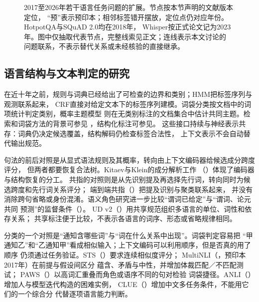 \begin{figure}[htbp]
  \centering
  
  \caption{2017至2026年若干语言任务问题的扩展。节点按本节声明的文献版本定位，
  “预”表示预印本；相邻标签错开摆放，定位点仍对应年份。HotpotQA与SQuAD 2.0均在2018年，
  Whisper按正式论文记为2023年。图中仅抽取代表节点，完整线索见正文；连线表示本文讨论的
  问题联系，不表示替代关系或未经核验的直接继承。}
  \label{fig:nlp-task-history}
\end{figure}

\FloatBarrier
\subsection{语言结构与文本判定的研究}
\label{sec:nlp-history-analysis-judgment}

在近十年之前，规则与词典已经给出了可检查的边界和类别；HMM把标签序列与观测联系起来，
CRF直接对给定文本下的标签序列建模。词袋分类按文档中的词项统计判定类别，概率主题模型
则在无类别标注的文档集合中估计共同主题。检索和词袋方法的背景可参见
，结构化标注可参见。
这些接口持续与神经表示共存：词典仍决定候选覆盖，结构解码仍检查标签合法性，
上下文表示不会自动替代输出规范。

句法的前后对照是从显式语法规则及其概率，转向由上下文编码器给候选成分跨度评分，
但两者都要恢复合法树。Kitaev与Klein的成分解析工作
（\citeyear{nlp-intro-kitaev2018}）体现了编码器与结构恢复的分工。
共指的对照则是从先识别提及再选择先行词，转向同时为候选跨度和先行词关系评分；
端到端共指（\citeyear{lee2017coreference}）把提及识别与聚类联系起来，
并没有消除跨句省略或身份混淆。语义角色研究进一步比较“谓词已给定”与“谓词、论元共同
预测”的监督条件（\citeyear{nlp-intro-he2018}）。
UD v2（\citeyear{nivre2020universal}）用共享规范组织多语言的单位、词性和依存关系；
共享标注便于比较，不表示各语言的词序、形态或省略规律相同。

分类的一个对照是“通知含哪些词”与“词在什么关系中出现”。词袋判定容易把
“甲通知乙”和“乙通知甲”看成相似输入；上下文编码可以利用顺序，但是否真的用了顺序
仍须通过任务验证。STS（\citeyear{nlp-intro-cer2017}）要求连续相似度评分；
MultiNLI（\citeyear{nlp-intro-williams2018}，预印本2017年）在前提与假设间区分
蕴含、矛盾与中性，并增加体裁匹配／不匹配测试；
PAWS（\citeyear{nlp-intro-zhang2019paws}）以高词汇重叠而角色或语序不同的句对检验
词袋捷径。ANLI（\citeyear{nlp-intro-nie2020}）增加人与模型迭代构造的困难实例，
CLUE（\citeyear{nlp-intro-xu2020clue}）增加中文多任务条件，不能用它们的一个综合分
代替逐项语言能力判断。

